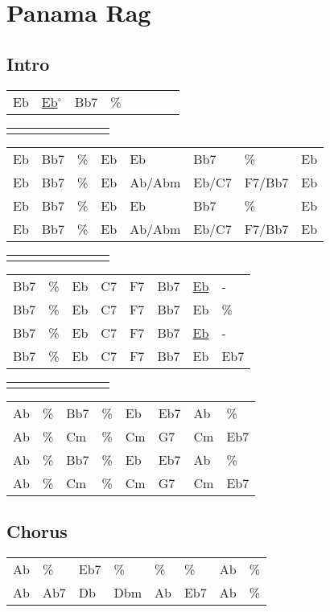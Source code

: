 \section{Panama Rag}


\subsection*{Intro}


\begin{tabular}{l l l l l l l l}
Eb & \underline{Eb$^{\circ}$} & Bb7 & \% \\ 
\end{tabular}


\begin{tabular}{l l l l l l l l}
\\ \\ 
\end{tabular}


\begin{tabular}{l l l l l l l l}
Eb & Bb7 & \% & Eb & Eb & Bb7 & \% & Eb \\ 
Eb & Bb7 & \% & Eb & Ab/Abm & Eb/C7 & F7/Bb7 & Eb \\ 
Eb & Bb7 & \% & Eb & Eb & Bb7 & \% & Eb \\ 
Eb & Bb7 & \% & Eb & Ab/Abm & Eb/C7 & F7/Bb7 & Eb \\ 
\end{tabular}


\begin{tabular}{l l l l l l l l}
\\ \\ 
\end{tabular}


\begin{tabular}{l l l l l l l l}
Bb7 & \% & Eb & C7 & F7 & Bb7 & \underline{Eb} & - \\ 
Bb7 & \% & Eb & C7 & F7 & Bb7 & Eb & \% \\ 
Bb7 & \% & Eb & C7 & F7 & Bb7 & \underline{Eb} & - \\ 
Bb7 & \% & Eb & C7 & F7 & Bb7 & Eb & Eb7 \\ 
\end{tabular}


\begin{tabular}{l l l l l l l l}
\\ \\ 
\end{tabular}


\begin{tabular}{l l l l l l l l}
Ab & \% & Bb7 & \% & Eb & Eb7 & Ab & \% \\ 
Ab & \% & Cm & \% & Cm & G7 & Cm & Eb7 \\ 
Ab & \% & Bb7 & \% & Eb & Eb7 & Ab & \% \\ 
Ab & \% & Cm & \% & Cm & G7 & Cm & Eb7 \\ 
\end{tabular}


\subsection*{Chorus}


\begin{tabular}{l l l l l l l l}
Ab & \% & Eb7 & \% & \% & \% & Ab & \% \\ 
Ab & Ab7 & Db & Dbm & Ab & Eb7 & Ab & \% \\ 
\end{tabular}

